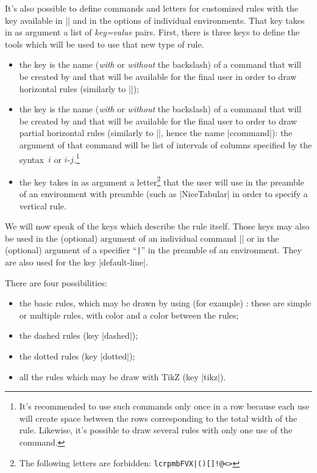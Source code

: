 \documentclass[dvipsnames]{article}
\begin{document}
\label{custom-line}


It's also possible to define commands and letters for customized rules with the
key  available in |\NiceMatrixOptions| and in the
options of individual environments. That key takes in as argument a list of
\textsl{key=value} pairs. First, there is three keys to define the tools which
will be used to use that new type of rule.

\begin{itemize}
\item the key  is the name (\emph{with} or \emph{without}
the backslash) of a command that will be created by  and that
will be available for the final user in order to draw horizontal rules
(similarly to |\hline|);

\item the key  is the name (\emph{with} or \emph{without}
the backslash) of a command that will be created by  and that
will be available for the final user to order to draw partial horizontal rules
(similarly to |\cline|, hence the name |ccommand|): the argument of that command
will be list of intervals of columns specified by the syntax~$i$ or
$i$-$j$.\footnote{It's recommended to use such commands only once in a row
  because each use will create space between the rows corresponding to the total
  width of the rule. Likewise, it's possible to draw several rules with only one
  use of the command.}

\item the key  takes in as argument a letter\footnote{The following
letters are forbidden: \verb+lcrpmbFVX|()[]!@<>+} that the user will use in
the preamble of an environment with preamble (such as |{NiceTabular}| in order
to specify a vertical rule.
\end{itemize}

\bigskip
We will now speak of the keys which describe the rule itself. Those keys may
also be used in the (optional) argument of an individual command |\Hline| or in
the (optional) argument of a specifier ``\verb+|+'' in the preamble of an
environment. They are also used for the key |default-line|.

\bigskip
There are four possibilities:
\begin{itemize}[beginpenalty=10000]
\item the basic rules, which may be drawn by using (for example) :
these are simple or multiple rules, with color and a color between the rules;
\item the dashed rules (key |dashed|);
\item the dotted rules (key |dotted|);
\item all the rules which may be draw with TikZ (key |tikz|).
\end{itemize}
\end{document}
